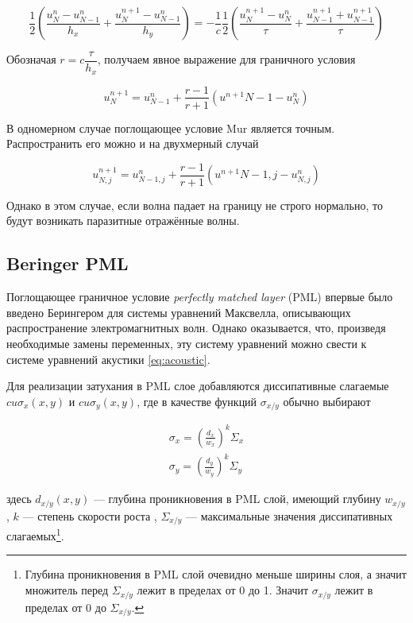 
\begin{equation}
    \dfrac{1}{2} \left(\dfrac{u^n_N - u^n_{N-1}}{h_x} + \dfrac{u^{n+1}_N - u^n_{N-1}}{h_y} \right) = -\dfrac{1}{c} \dfrac{1}{2}\left(\dfrac{u^{n+1}_N - u^n_N}{\tau} + \dfrac{u^{n+1}_{N-1} + u^{n+1}_{N-1}}{\tau} \right)
\end{equation}

Обозначая $r = c\dfrac{\tau}{h_x}$, получаем явное выражение для граничного условия

\begin{equation}
    u^{n+1}_N = u^n_{N-1} + \dfrac{r-1}{r+1}(u^{n+1}{N-1}-u^n_N)
\end{equation}

В одномерном случае поглощающее условие Mur является точным. Распространить его можно и на двухмерный случай

\begin{equation}
    u^{n+1}_{N,j} = u^n_{N-1,j} + \dfrac{r-1}{r+1}(u^{n+1}{N-1,j}-u^n_{N,j})
\end{equation}

Однако в этом случае, если волна падает на границу не строго нормально, то будут возникать паразитные отражённые волны.

\subsection{Beringer PML}

Поглощающее граничное условие \textit{perfectly matched layer} (PML) впервые было введено Берингером для системы уравнений Максвелла, описывающих распространение электромагнитных волн. Однако оказывается, что, произведя необходимые замены переменных, эту систему уравнений можно свести к системе уравнений акустики \ref{eq:acoustic}.

Для реализации затухания в PML слое добавляются диссипативные слагаемые $c u \sigma_x(x,y)$ и $c u \sigma_y(x,y)$, где в качестве функций $\sigma_{x/y}$ обычно выбирают

\begin{gather}
	\sigma_x = \left(\frac{d_x}{w_{x}}\right)^k \Sigma_{x}\\
	\sigma_y = \left(\frac{d_y}{w_{y}}\right)^k \Sigma_{y}
\end{gather}
    
здесь $d_{x/y}(x,y)$ --- глубина проникновения в PML слой, имеющий глубину $w_{x/y}$, $k$ --- степень скорости роста , $\Sigma_{x/y}$ --- максимальные значения диссипативных слагаемых\footnote{Глубина проникновения в PML слой очевидно меньше ширины слоя, а значит множитель перед $\Sigma_{x/y}$ лежит в пределах от 0 до 1. Значит $\sigma_{x/y}$ лежит в пределах от 0 до $\Sigma_{x/y}$.}. 

